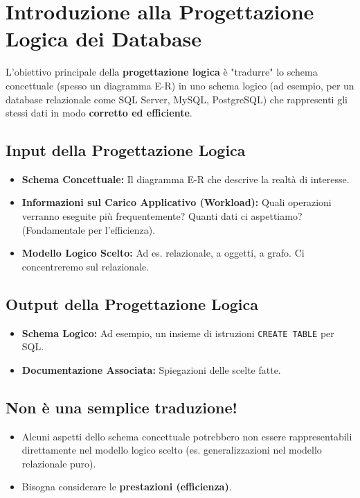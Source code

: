 \section{Introduzione alla Progettazione Logica dei Database}
L'obiettivo principale della \textbf{progettazione logica} è "tradurre" lo schema concettuale (spesso un diagramma E-R) in uno schema logico (ad esempio, per un database relazionale come SQL Server, MySQL, PostgreSQL) che rappresenti gli stessi dati in modo \textbf{corretto ed efficiente}.

\subsection{Input della Progettazione Logica}
\begin{itemize}
	\item \textbf{Schema Concettuale:} Il diagramma E-R che descrive la realtà di interesse.
	\item \textbf{Informazioni sul Carico Applicativo (Workload):} Quali operazioni verranno eseguite più frequentemente? Quanti dati ci aspettiamo? (Fondamentale per l'efficienza).
	\item \textbf{Modello Logico Scelto:} Ad es. relazionale, a oggetti, a grafo. Ci concentreremo sul relazionale.
\end{itemize}

\subsection{Output della Progettazione Logica}
\begin{itemize}
	\item \textbf{Schema Logico:} Ad esempio, un insieme di istruzioni \texttt{CREATE TABLE} per SQL.
	\item \textbf{Documentazione Associata:} Spiegazioni delle scelte fatte.
\end{itemize}

\subsection{Non è una semplice traduzione!}
\begin{itemize}
	\item Alcuni aspetti dello schema concettuale potrebbero non essere rappresentabili direttamente nel modello logico scelto (es. generalizzazioni nel modello relazionale puro).
	\item Bisogna considerare le \textbf{prestazioni (efficienza)}.
\end{itemize}

